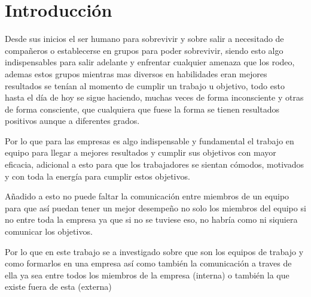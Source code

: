 \newpage
\section*{Introducción}

Desde sus inicios el ser humano para sobrevivir y sobre salir
a necesitado de compañeros o establecerse en grupos para 
poder sobrevivir, siendo esto algo indispensables para
salir adelante y enfrentar cualquier amenaza que los rodeo, 
ademas estos grupos mientras mas diversos en habilidades
eran mejores resultados se tenían al momento de cumplir un
trabajo u objetivo, todo esto hasta el día de hoy se sigue
haciendo, muchas veces de forma inconsciente y otras de
forma consciente, que cualquiera que fuese la forma
se tienen resultados positivos aunque a diferentes grados.

Por lo que para las empresas es algo indispensable y fundamental
el trabajo en equipo para llegar a mejores resultados y cumplir
sus objetivos con mayor eficacia, adicional a esto para que los
trabajadores se sientan cómodos, motivados y con toda la energía
para cumplir estos objetivos.

Añadido a esto no puede faltar la comunicación entre
miembros de un equipo para que así puedan tener un mejor
desempeño no solo los miembros del equipo si no entre toda
la empresa ya que si no se tuviese eso, no habría como ni
siquiera comunicar los objetivos.

Por lo que en este trabajo se a investigado sobre que son
los equipos de trabajo y como formarlos en una empresa así como
también la comunicación a traves de ella ya sea
entre todos los miembros de la empresa (interna) o también
la que existe fuera de esta (externa)

